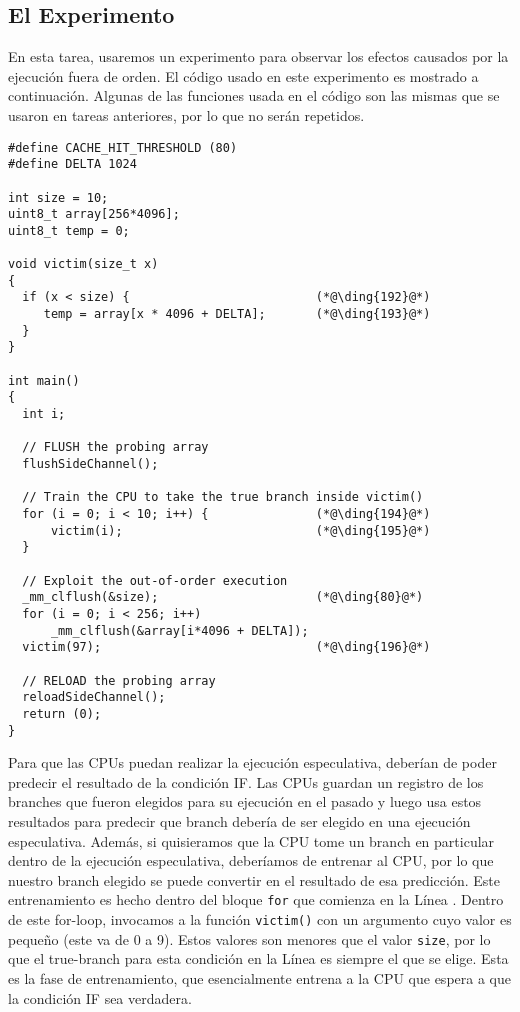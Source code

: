 \subsection{El Experimento}

En esta tarea, usaremos un experimento para observar los efectos causados por la ejecución fuera de orden. El código usado en este experimento es mostrado a continuación.
Algunas de las funciones usada en el código son las mismas que se usaron en tareas anteriores, por lo que no serán repetidos.

\begin{lstlisting}[caption=\texttt{SpectreExperiment.c}, label=spectre:list:outoforder]
#define CACHE_HIT_THRESHOLD (80)
#define DELTA 1024

int size = 10;
uint8_t array[256*4096];
uint8_t temp = 0;

void victim(size_t x) 
{
  if (x < size) {                          (*@\ding{192}@*)
     temp = array[x * 4096 + DELTA];       (*@\ding{193}@*)
  }
}

int main() 
{
  int i;

  // FLUSH the probing array
  flushSideChannel();

  // Train the CPU to take the true branch inside victim()
  for (i = 0; i < 10; i++) {               (*@\ding{194}@*)
      victim(i);                           (*@\ding{195}@*)
  }

  // Exploit the out-of-order execution 
  _mm_clflush(&size);                      (*@\ding{80}@*)
  for (i = 0; i < 256; i++)  
      _mm_clflush(&array[i*4096 + DELTA]);
  victim(97);                              (*@\ding{196}@*)

  // RELOAD the probing array
  reloadSideChannel();
  return (0);
}
\end{lstlisting}

Para que las CPUs puedan realizar la ejecución especulativa, deberían de poder predecir el resultado de la condición IF. Las CPUs guardan un registro de los branches que fueron elegidos para su ejecución en el pasado y luego usa estos resultados para predecir que branch debería de ser elegido en una ejecución especulativa.
Además, si quisieramos que la CPU tome un branch en particular dentro de la ejecución especulativa, deberíamos de entrenar al CPU, por lo que nuestro branch elegido se puede convertir en el resultado de esa predicción. Este entrenamiento es hecho dentro del bloque \texttt{for} que comienza en la Línea . 
Dentro de este for-loop, invocamos a la función \texttt{victim()} con un argumento cuyo valor es pequeño (este va de 0 a 9).
Estos valores son menores que el valor \texttt{size}, por lo que el true-branch para esta condición en la Línea  es siempre el que se elige. Esta es la fase de entrenamiento, que esencialmente entrena a la CPU que espera a que la 
condición IF sea verdadera.

